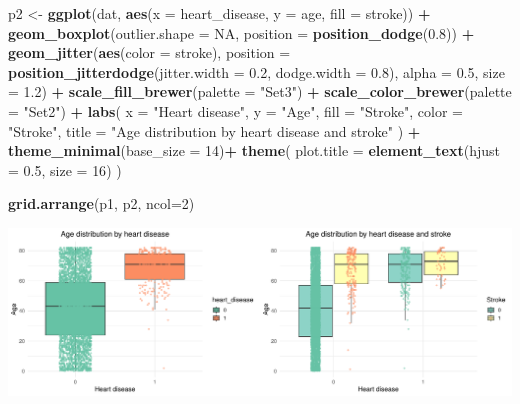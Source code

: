 \documentclass[
]{article}
\newenvironment{Shaded}{\begin{snugshade}}{\end{snugshade}}
\newcommand{\AttributeTok}[1]{\textcolor[rgb]{0.13,0.29,0.53}{#1}}
\newcommand{\ConstantTok}[1]{\textcolor[rgb]{0.56,0.35,0.01}{#1}}
\newcommand{\DecValTok}[1]{\textcolor[rgb]{0.00,0.00,0.81}{#1}}
\newcommand{\FloatTok}[1]{\textcolor[rgb]{0.00,0.00,0.81}{#1}}
\newcommand{\FunctionTok}[1]{\textcolor[rgb]{0.13,0.29,0.53}{\textbf{#1}}}
\newcommand{\NormalTok}[1]{#1}
\newcommand{\OtherTok}[1]{\textcolor[rgb]{0.56,0.35,0.01}{#1}}
\newcommand{\SpecialCharTok}[1]{\textcolor[rgb]{0.81,0.36,0.00}{\textbf{#1}}}
\newcommand{\StringTok}[1]{\textcolor[rgb]{0.31,0.60,0.02}{#1}}
\begin{document}
\begin{Shaded}
\begin{Highlighting}[]
\NormalTok{p2 }\OtherTok{\textless{}{-}} \FunctionTok{ggplot}\NormalTok{(dat, }\FunctionTok{aes}\NormalTok{(}\AttributeTok{x =}\NormalTok{ heart\_disease, }\AttributeTok{y =}\NormalTok{ age, }\AttributeTok{fill =}\NormalTok{ stroke)) }\SpecialCharTok{+} 
      \FunctionTok{geom\_boxplot}\NormalTok{(}\AttributeTok{outlier.shape =} \ConstantTok{NA}\NormalTok{, }\AttributeTok{position =} \FunctionTok{position\_dodge}\NormalTok{(}\FloatTok{0.8}\NormalTok{)) }\SpecialCharTok{+}
      \FunctionTok{geom\_jitter}\NormalTok{(}\FunctionTok{aes}\NormalTok{(}\AttributeTok{color =}\NormalTok{ stroke), }
                  \AttributeTok{position =} \FunctionTok{position\_jitterdodge}\NormalTok{(}\AttributeTok{jitter.width =} \FloatTok{0.2}\NormalTok{, }\AttributeTok{dodge.width =} \FloatTok{0.8}\NormalTok{),}
                  \AttributeTok{alpha =} \FloatTok{0.5}\NormalTok{, }\AttributeTok{size =} \FloatTok{1.2}\NormalTok{) }\SpecialCharTok{+}
      \FunctionTok{scale\_fill\_brewer}\NormalTok{(}\AttributeTok{palette =} \StringTok{"Set3"}\NormalTok{) }\SpecialCharTok{+}
      \FunctionTok{scale\_color\_brewer}\NormalTok{(}\AttributeTok{palette =} \StringTok{"Set2"}\NormalTok{) }\SpecialCharTok{+}
      \FunctionTok{labs}\NormalTok{(}
        \AttributeTok{x =} \StringTok{"Heart disease"}\NormalTok{,}
        \AttributeTok{y =} \StringTok{"Age"}\NormalTok{,}
        \AttributeTok{fill =} \StringTok{"Stroke"}\NormalTok{,}
        \AttributeTok{color =} \StringTok{"Stroke"}\NormalTok{,}
        \AttributeTok{title =} \StringTok{"Age distribution by heart disease and stroke"}
\NormalTok{      ) }\SpecialCharTok{+}
      \FunctionTok{theme\_minimal}\NormalTok{(}\AttributeTok{base\_size =} \DecValTok{14}\NormalTok{)}\SpecialCharTok{+}
      \FunctionTok{theme}\NormalTok{(}
         \AttributeTok{plot.title =} \FunctionTok{element\_text}\NormalTok{(}\AttributeTok{hjust =} \FloatTok{0.5}\NormalTok{, }\AttributeTok{size =} \DecValTok{16}\NormalTok{)}
\NormalTok{      )}

\FunctionTok{grid.arrange}\NormalTok{(p1, p2, }\AttributeTok{ncol=}\DecValTok{2}\NormalTok{)}
\end{Highlighting}
\end{Shaded}

\includegraphics{Build-deploy-stroke-prediction-model-R_files/figure-latex/pairwise_age_heart_disease-1.pdf}
\end{document}
